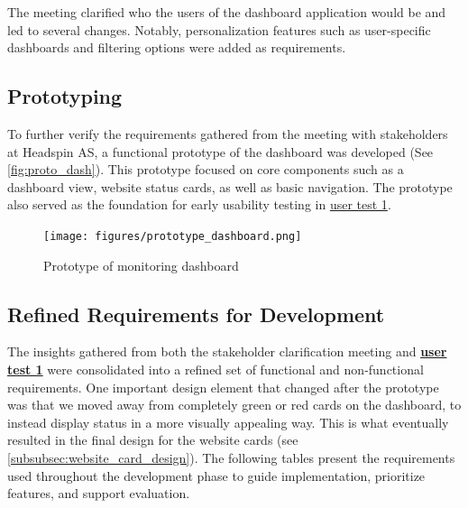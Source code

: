 The meeting clarified who the users of the dashboard application would be and led to several changes. Notably, personalization features such as user-specific dashboards and filtering options were added as requirements. 

\subsection{Prototyping}

To further verify the requirements gathered from the meeting with stakeholders at Headspin AS, a functional prototype of the dashboard was developed (See \ref{fig:proto_dash}). This prototype focused on core components such as a dashboard view,  website status cards, as well as basic navigation. The prototype also served as the foundation for early usability testing in \hyperref[subsec:user_testing]{user test 1}. 

\begin{figure}[H]
    \centering
    \texttt{[image: figures/prototype\_dashboard.png]}
    \caption{Prototype of monitoring dashboard}
    \label{o_dash}
\end{figure}



\subsection{Refined Requirements for Development}
\label{subsec:reqs_after_proto}

The insights gathered from both the stakeholder clarification meeting and \textbf{\hyperref[subsec:user_testing]{user test 1}} were consolidated into a refined set of functional and non-functional requirements.  One important design element that changed after the prototype was that we moved away from completely green or red cards on the dashboard, to instead display status in a more visually appealing way. This is what eventually resulted in the final design for the website cards (see \ref{subsubsec:website_card_design}). The following tables present the requirements used throughout the development phase to guide implementation, prioritize features, and support evaluation.


